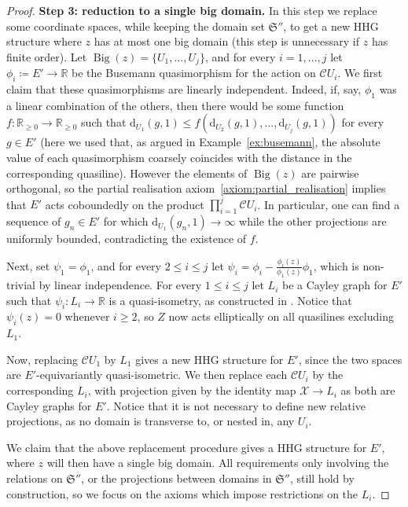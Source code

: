 \documentclass[svgnames]{amsart}
\theoremstyle{plain}
\theoremstyle{definition}
\newcommand{\cal}[1]{\mathcal{#1}}
\newcommand{\R}{\mathbb{R}}
\newcommand{\frakS}{\mathfrak{S}}
\newcommand{\C}{\cal C}
\newcommand{\Bigdom}[1]{\operatorname{Big}\left(#1\right)}
\newcommand{\dist}{\mathrm{d}}
\begin{document}
\begin{proof}
    \par\medskip
    \textbf{Step 3: reduction to a single big domain.}
    In this step we replace some coordinate spaces, while keeping the domain set $\frakS''$, to get a new HHG structure where $z$ has at most one big domain (this step is unnecessary if $z$ has finite order). Let $\Bigdom{z}=\{U_1,\ldots,U_j\}$, and for every $i=1,\ldots, j$ let $\phi_i\coloneq E'\to \R$ be the Busemann quasimorphism for the action on $\C U_i$. We first claim that these quasimorphisms are linearly independent. Indeed, if, say, $\phi_1$ was a linear combination of the others, then there would be some function $f\colon \R_{\ge0}\to \R_{\ge0}$ such that $\dist_{U_1}(g,1)\le f(\dist_{U_2}(g,1), \ldots, \dist_{U_j}(g,1))$ for every $g\in E'$ (here we used that, as argued in Example~\ref{ex:busemann}, the absolute value of each quasimorphism coarsely coincides with the distance in the corresponding quasiline). However the elements of $\Bigdom{z}$ are pairwise orthogonal, so the partial realisation axiom~\ref{axiom:partial_realisation} implies that $E'$ acts coboundedly on the product $\prod_{i=1}^j\C U_i$. In particular, one can find a sequence of $g_n\in E'$ for which $\dist_{U_1}(g_n,1)\to\infty $ while the other projections are uniformly bounded, contradicting the existence of $f$. 

    Next, set $\psi_1=\phi_1$, and for every $ 2\le i\le j$ let $\psi_i=\phi_i-\frac{\phi_i(z)}{\phi_1(z)}\phi_1$, which is non-trivial by linear independence. For every $1\le i\le j$ let $L_i$ be a Cayley graph for $E'$ such that $\psi_i\colon L_i\to \R$ is a quasi-isometry, as constructed in \cite[Lemma 4.15]{ABO}. Notice that $\psi_i(z)=0$ whenever $i\ge 2$, so $Z$ now acts elliptically on all quasilines excluding $L_1$. 

    Now, replacing $\C U_1$ by $L_1$ gives a new HHG structure for $E'$, since the two spaces are $E'$-equivariantly quasi-isometric. We then replace each $\C U_i$ by the corresponding $L_i$, with projection given by the identity map $\cal X\to L_i$ as both are Cayley graphs for $E'$. Notice that it is not necessary to define new relative projections, as no domain is transverse to, or nested in, any $U_i$.
    
    We claim that the above replacement procedure gives a HHG structure for $E'$, where $z$ will then have a single big domain. All requirements only involving the relations on $\frakS''$, or the projections between domains in $\frakS''$, still hold by construction, so we focus on the axioms which impose restrictions on the $L_i$.
    

\end{proof}
\end{document}
